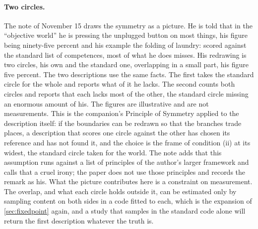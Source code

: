 
\paragraph{Two circles.} The note of November 15 draws the symmetry as a picture. He is told that in the ``objective world'' he is pressing the unplugged button on most things, his figure being ninety-five percent and his example the folding of laundry: scored against the standard list of competences, most of what he does misses. His redrawing is two circles, his own and the standard one, overlapping in a small part, his figure five percent. The two descriptions use the same facts. The first takes the standard circle for the whole and reports what of it he lacks. The second counts both circles and reports that each lacks most of the other, the standard circle missing an enormous amount of his. The figures are illustrative and are not measurements. This is the companion's Principle of Symmetry \cite{NormCost} applied to the description itself: if the boundaries can be redrawn so that the branches trade places, a description that scores one circle against the other has chosen its reference and has not found it, and the choice is the frame of condition (ii) at its widest, the standard circle taken for the world. The note adds that this assumption runs against a list of principles of the author's larger framework \cite{Aethus} and calls that a cruel irony; the paper does not use those principles and records the remark as his. What the picture contributes here is a constraint on measurement. The overlap, and what each circle holds outside it, can be estimated only by sampling content on both sides in a code fitted to each, which is the expansion of \autoref{sec:fixedpoint} again, and a study that samples in the standard code alone will return the first description whatever the truth is.

